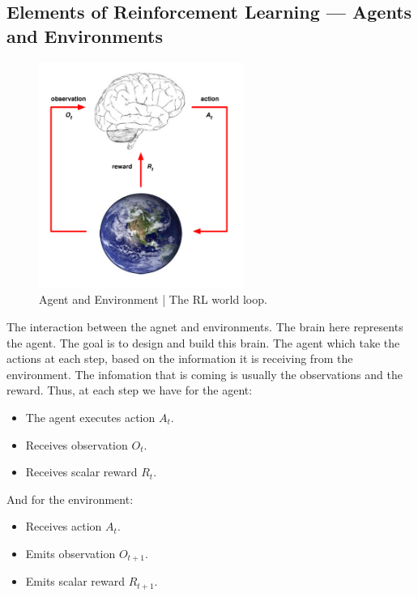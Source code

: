 \subsection{Elements of Reinforcement Learning --- Agents and Environments}
\begin{figure}[H]
    \centering
    \includegraphics[width=0.60\textwidth]{figures/agent_world.png}
    \caption{Agent and Environment | The RL world loop.}
    \label{fig:agent_world}
\end{figure}

The interaction between the agnet and environments. The brain here represents 
the agent. The goal is to design and build this brain. The agent which take
the actions at each step, based on the information it is receiving from the
environment. The infomation that is coming is usually the observations
and the reward.
Thus, at each step we have for the agent:
\begin{itemize}
    \item The agent executes action \(A_t\).
    \item Receives observation \(O_t\).
    \item Receives scalar reward \(R_t\).
\end{itemize}
And for the environment:
\begin{itemize}
    \item Receives action \(A_t\).
    \item Emits observation \(O_{t+1}\).
    \item Emits scalar reward \(R_{t+1}\).
\end{itemize}

